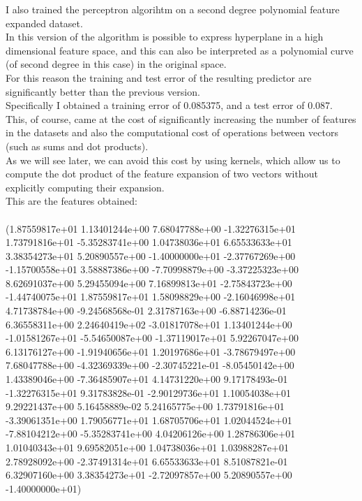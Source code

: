 I also trained the perceptron algorihtm on a second degree polynomial feature expanded dataset.\\
In this version of the algorithm is possible to express hyperplane in a high dimensional feature space, and this can also be interpreted as a polynomial curve (of second degree in this case) in the original space.\\
For this reason the training and test error of the resulting predictor are significantly better than the previous version.\\
Specifically I obtained a training error of 0.085375, and a test error of 0.087.\\
This, of course, came at the cost of significantly increasing the number of features in the datasets and also the computational cost of operations between vectors (such as sums and dot products).\\
As we will see later, we can avoid this cost by using kernels, which allow us to compute the dot product of the feature expansion of two vectors without explicitly computing their expansion.\\ 
This are the features obtained:\\\\
(1.87559817e+01  1.13401244e+00  7.68047788e+00 -1.32276315e+01\\
  1.73791816e+01 -5.35283741e+00  1.04738036e+01  6.65533633e+01\\
  3.38354273e+01  5.20890557e+00 -1.40000000e+01 -2.37767269e+00\\
 -1.15700558e+01  3.58887386e+00 -7.70998879e+00 -3.37225323e+00\\
  8.62691037e+00  5.29455094e+00  7.16899813e+01 -2.75843723e+00\\
 -1.44740075e+01  1.87559817e+01  1.58098829e+00 -2.16046998e+01\\
  4.71738784e+00 -9.24568568e-01  2.31787163e+00 -6.88714236e-01\\
  6.36558311e+00  2.24640419e+02 -3.01817078e+01  1.13401244e+00\\
 -1.01581267e+01 -5.54650087e+00 -1.37119017e+01  5.92267047e+00\\
  6.13176127e+00 -1.91940656e+01  1.20197686e+01 -3.78679497e+00\\
  7.68047788e+00 -4.32369339e+00 -2.30745221e-01 -8.05450142e+00\\
  1.43389046e+00 -7.36485907e+01  4.14731220e+00  9.17178493e-01\\
 -1.32276315e+01  9.31783828e-01 -2.90129736e+01  1.10054038e+01\\
  9.29221437e+00  5.16458889e-02  5.24165775e+00  1.73791816e+01\\
 -3.39061351e+00  1.79056771e+01  1.68705706e+01  1.02044524e+01\\
 -7.88104212e+00 -5.35283741e+00  4.04206126e+00  1.28786306e+01\\
  1.01040343e+01  9.69582051e+00  1.04738036e+01  1.03988287e+01\\
  2.78928092e+00 -2.37491314e+01  6.65533633e+01  8.51087821e-01\\
  6.32907160e+00  3.38354273e+01 -2.72097857e+00  5.20890557e+00\\
 -1.40000000e+01) \\